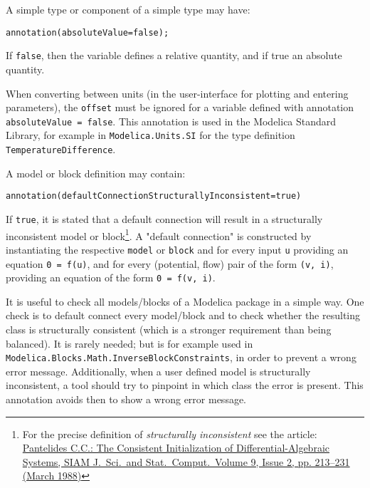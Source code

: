 A simple type or component of a simple type may have:
\begin{lstlisting}[language=modelica]
annotation(absoluteValue=false);
\end{lstlisting}

If \lstinline!false!, then the variable defines a relative quantity, and if true an
absolute quantity.

\begin{nonnormative}
When converting between units (in the user-interface for plotting and entering parameters), the \lstinline!offset! must be
ignored for a variable defined with annotation \lstinline!absoluteValue = false!.
This annotation is used in the Modelica Standard Library, for example in
\lstinline!Modelica.Units.SI! for the type definition \lstinline!TemperatureDifference!.
\end{nonnormative}

A model or block definition may contain:
\begin{lstlisting}[language=modelica]
annotation(defaultConnectionStructurallyInconsistent=true)
\end{lstlisting}

If \lstinline!true!, it is stated that a default connection will result in a structurally inconsistent model or block\footnote{%
  For the precise definition of \emph{structurally inconsistent} see the article: \href{http://epubs.siam.org/doi/abs/10.1137/0909014}{Pantelides C.C.: The Consistent Initialization of Differential-Algebraic Systems, SIAM J.\ Sci.\ and Stat.\ Comput.\ Volume 9, Issue 2, pp. 213--231 (March 1988)}}.
A "default connection" is constructed by instantiating the respective \lstinline!model! or \lstinline!block! and for every input \lstinline!u! providing an equation \lstinline!0 = f(u)!, and for every (potential, flow) pair of the form \lstinline!(v, i)!, providing an equation of the form \lstinline!0 = f(v, i)!.

\begin{nonnormative}
It is useful to check all models/blocks of a Modelica package in a simple way.  One check is to default connect every model/block and to check whether the resulting class is structurally consistent (which is a stronger requirement than being balanced).  It is rarely needed; but is for example used in \lstinline!Modelica.Blocks.Math.InverseBlockConstraints!, in order to prevent a wrong error message.  Additionally, when a user defined model is structurally inconsistent, a tool should try to pinpoint in which class the error is present.  This annotation avoids then to show a wrong error message.
\end{nonnormative}

